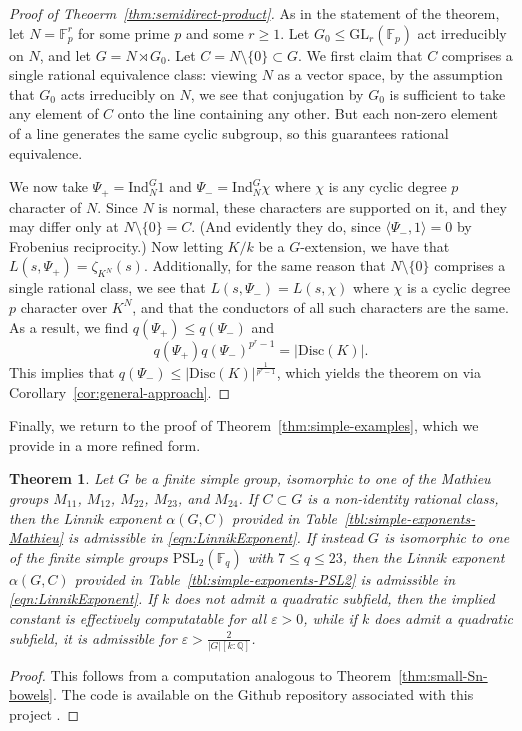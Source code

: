\documentclass[12pt]{amsart}
\newtheorem{theorem}{Theorem}
\theoremstyle{definition} \newtheorem{definition}[theorem]{Definition}
\theoremstyle{example} \newtheorem{example}[theorem]{Example}
\theoremstyle{remark} \newtheorem{remark}{Remark}[theorem]
\numberwithin{equation}{section}
\numberwithin{theorem}{section}
\renewcommand{\epsilon}{\varepsilon}
\renewcommand{\leq}{\leqslant}
\renewcommand{\geq}{\geqslant}
\begin{document}
	\begin{proof}[Proof of Theoerm~\ref{thm:semidirect-product}]
		As in the statement of the theorem, let $N = \mathbb{F}_p^r$ for some prime $p$ and some $r \geq 1$.  Let $G_0 \leq \mathrm{GL}_r(\mathbb{F}_p)$ act irreducibly on $N$, and let $G = N \rtimes G_0$.  Let $C = N \setminus \{0\} \subset G$.  We first claim that $C$ comprises a single rational equivalence class: viewing $N$ as a vector space, by the assumption that $G_0$ acts irreducibly on $N$, we see that conjugation by $G_0$ is sufficient to take any element of $C$ onto the line containing any other.  But each non-zero element of a line generates the same cyclic subgroup, so this guarantees rational equivalence.
		
		We now take $\Psi_+ = \mathrm{Ind}_N^G 1$ and $\Psi_- = \mathrm{Ind}_N^G \chi$ where $\chi$ is any cyclic degree $p$ character of $N$.  Since $N$ is normal, these characters are supported on it, and they may differ only at $N \setminus \{0\} = C$.  (And evidently they do, since $\langle \Psi_-,1\rangle = 0$ by Frobenius reciprocity.)  Now letting $K/k$ be a $G$-extension, we have that $L(s,\Psi_+) = \zeta_{K^N}(s)$.  Additionally, for the same reason that $N\setminus \{0\}$ comprises a single rational class, we see that $L(s,\Psi_-) = L(s,\chi)$ where $\chi$ is a cyclic degree $p$ character over $K^N$, and that the conductors of all such characters are the same.  As a result, we find $q(\Psi_+) \leq q(\Psi_-)$ and
			\[
				q(\Psi_+) q(\Psi_-)^{p^r-1} = |\mathrm{Disc}(K)|.
			\]
		This implies that $q(\Psi_-) \leq |\mathrm{Disc}(K)|^{\frac{1}{p^r-1}}$, which yields the theorem on via  Corollary~\ref{cor:general-approach}.
	\end{proof}
	
	Finally, we return to the proof of Theorem~\ref{thm:simple-examples}, which we provide in a more refined form.
	
	\begin{theorem} \label{thm:better-simple-examples}
		Let $G$ be a finite simple group, isomorphic to one of the Mathieu groups $M_{11}$, $M_{12}$, $M_{22}$, $M_{23}$, and $M_{24}$.  If $C \subset G$ is a non-identity rational class, then the Linnik exponent $\alpha(G,C)$ provided in Table~\ref{tbl:simple-exponents-Mathieu} is admissible in \eqref{eqn:LinnikExponent}.  If instead $G$ is isomorphic to one of the finite simple groups $\mathrm{PSL}_2(\mathbb{F}_q)$ with $7 \leq q \leq 23$, then the Linnik exponent $\alpha(G,C)$ provided in Table~\ref{tbl:simple-exponents-PSL2} is admissible in \eqref{eqn:LinnikExponent}.  If $k$ does not admit a quadratic subfield, then the implied constant is effectively computatable for all $\epsilon>0$, while if $k$ does admit a quadratic subfield, it is admissible for $\epsilon > \frac{2}{|G|[k:\mathbb{Q}]}$.
	\end{theorem}
	\begin{proof}
		This follows from a computation analogous to Theorem~\ref{thm:small-Sn-bowels}.  The code is available on the Github repository associated with this project \cite{github}.
	\end{proof}
	
\end{document}
